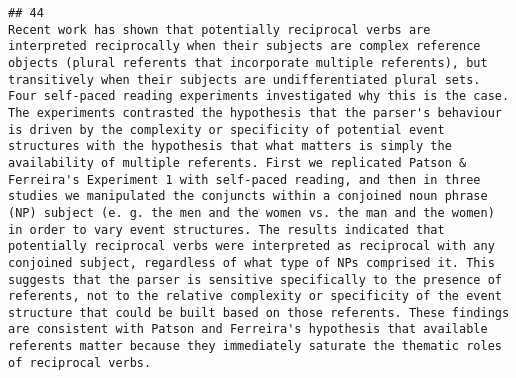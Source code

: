 \documentclass[
  english,
  man]{apa6}
\begin{document}
\begin{verbatim}
## 44                                                                                                                                                                                                                                                                                                                                                                                                                                                                                                                                                                                                                                                                                                                                                                                                                                                                                                                                                                                                                                                                                                                                                                                                                                                    Recent work has shown that potentially reciprocal verbs are interpreted reciprocally when their subjects are complex reference objects (plural referents that incorporate multiple referents), but transitively when their subjects are undifferentiated plural sets. Four self-paced reading experiments investigated why this is the case. The experiments contrasted the hypothesis that the parser's behaviour is driven by the complexity or specificity of potential event structures with the hypothesis that what matters is simply the availability of multiple referents. First we replicated Patson & Ferreira's Experiment 1 with self-paced reading, and then in three studies we manipulated the conjuncts within a conjoined noun phrase (NP) subject (e. g. the men and the women vs. the man and the women) in order to vary event structures. The results indicated that potentially reciprocal verbs were interpreted as reciprocal with any conjoined subject, regardless of what type of NPs comprised it. This suggests that the parser is sensitive specifically to the presence of referents, not to the relative complexity or specificity of the event structure that could be built based on those referents. These findings are consistent with Patson and Ferreira's hypothesis that available referents matter because they immediately saturate the thematic roles of reciprocal verbs.

\end{verbatim}
\end{document}
